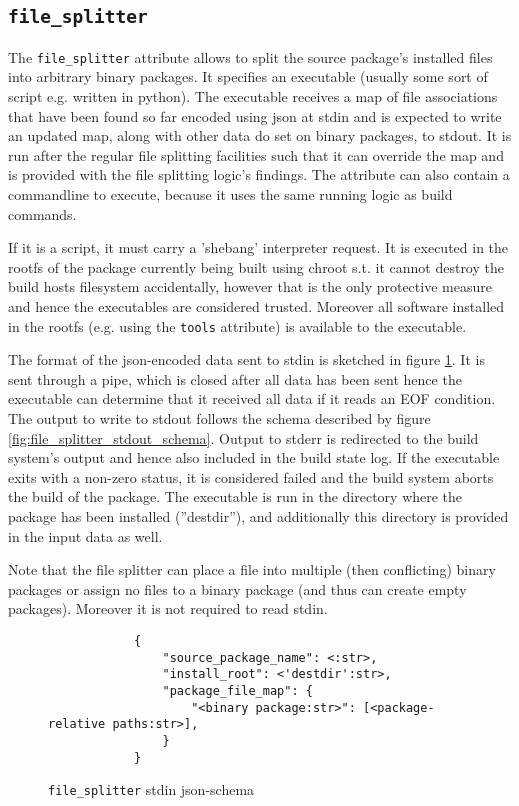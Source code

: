 \documentclass[a4paper]{scrartcl}
\begin{document}
	
	\subsection{\texttt{file\_splitter}}
	\label{sec:file_splitter}
	
	The \texttt{file\_splitter} attribute allows to split the source package's installed files into arbitrary binary packages. It specifies an executable (usually some sort of script e.g. written in python). The executable receives a map of file associations that have been found so far encoded using json at stdin and is expected to write an updated map, along with other data do set on binary packages, to stdout. It is run after the regular file splitting facilities such that it can override the map and is provided with the file splitting logic's findings. The attribute can also contain a commandline to execute, because it uses the same running logic as build commands.
	
	If it is a script, it must carry a 'shebang' interpreter request. It is executed in the rootfs of the package currently being built using chroot s.t. it cannot destroy the build hosts filesystem accidentally, however that is the only protective measure and hence the executables are considered trusted. Moreover all software installed in the rootfs (e.g. using the \texttt{tools} attribute) is available to the executable.
	
	The format of the json-encoded data sent to stdin is sketched in figure \ref{fig:file_splitter_stdin_schema}. It is sent through a pipe, which is closed after all data has been sent hence the executable can determine that it received all data if it reads an EOF condition. The output to write to stdout follows the schema described by figure \ref{fig:file_splitter_stdout_schema}. Output to stderr is redirected to the build system's output and hence also included in the build state log. If the executable exits with a non-zero status, it is considered failed and the build system aborts the build of the package. The executable is run in the directory where the package has been installed (''destdir''), and additionally this directory is provided in the input data as well.
	
	Note that the file splitter can place a file into multiple (then conflicting) binary packages or assign no files to a binary package (and thus can create empty packages). Moreover it is not required to read stdin.
	
	\begin{figure}[htp]
		\centering
		
		\begin{minipage}{0.8\textwidth}
			\begin{lstlisting}
			{
				"source_package_name": <:str>,
				"install_root": <'destdir':str>,
				"package_file_map": {
					"<binary package:str>": [<package-relative paths:str>],
				}
			}
			\end{lstlisting}
		\end{minipage}
		
		\caption{\texttt{file\_splitter} stdin json-schema}
		\label{fig:file_splitter_stdin_schema}
	\end{figure}
\end{document}
